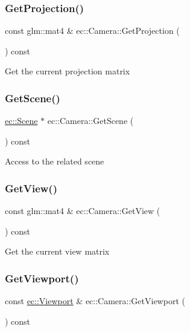 \subsubsection{\texorpdfstring{Get\+Projection()}{GetProjection()}}
{\footnotesize\ttfamily const glm\+::mat4 \& ec\+::\+Camera\+::\+Get\+Projection (\begin{DoxyParamCaption}{ }\end{DoxyParamCaption}) const}

Get the current projection matrix \mbox{\label{classec_1_1_camera_a77f8c613ff916b697bdab94d4a610e5d}} 
\subsubsection{\texorpdfstring{Get\+Scene()}{GetScene()}}
{\footnotesize\ttfamily \mbox{\hyperlink{classec_1_1_scene}{ec\+::\+Scene}} $\ast$ ec\+::\+Camera\+::\+Get\+Scene (\begin{DoxyParamCaption}{ }\end{DoxyParamCaption}) const}

Access to the related scene \mbox{\label{classec_1_1_camera_ad5ed2007c501081561fd8ee894f86ae0}} 
\subsubsection{\texorpdfstring{Get\+View()}{GetView()}}
{\footnotesize\ttfamily const glm\+::mat4 \& ec\+::\+Camera\+::\+Get\+View (\begin{DoxyParamCaption}{ }\end{DoxyParamCaption}) const}

Get the current view matrix \mbox{\label{classec_1_1_camera_a6997f9c09e6cf43b1e7440eb2af83eb2}} 
\subsubsection{\texorpdfstring{Get\+Viewport()}{GetViewport()}}
{\footnotesize\ttfamily const \mbox{\hyperlink{classec_1_1_viewport}{ec\+::\+Viewport}} \& ec\+::\+Camera\+::\+Get\+Viewport (\begin{DoxyParamCaption}{ }\end{DoxyParamCaption}) const}

